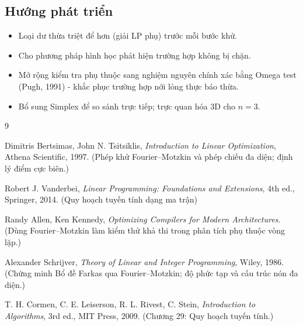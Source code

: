 \documentclass[12pt,a4paper]{article}
\theoremstyle{definition}
\begin{document}
\subsection{Hướng phát triển}

\begin{itemize}
    \item Loại dư thừa triệt để hơn (giải LP phụ) trước mỗi bước khử.
    \item Cho phương pháp hình học phát hiện trường hợp không bị chặn.
    \item Mở rộng kiểm tra phụ thuộc sang nghiệm nguyên chính xác bằng Omega
          test (Pugh, 1991) - khắc phục trường hợp nới lỏng thực báo thừa.
    \item Bổ sung Simplex để so sánh trực tiếp; trực quan hóa 3D cho $n = 3$.
\end{itemize}

\newpage
\renewcommand{\refname}{Tài liệu tham khảo}
\renewcommand{\bibname}{Tài liệu tham khảo}
\gappto\captionsvietnamese{%
  \renewcommand{\refname}{Tài liệu tham khảo}%
  \renewcommand{\bibname}{Tài liệu tham khảo}%
}

\begin{thebibliography}{9}

Dimitris Bertsimas, John N. Tsitsiklis,
\textit{Introduction to Linear Optimization},
Athena Scientific, 1997. (Phép khử Fourier--Motzkin và phép chiếu đa diện;
định lý điểm cực biên.)

Robert J. Vanderbei,
\textit{Linear Programming: Foundations and Extensions},
4th ed., Springer, 2014. (Quy hoạch tuyến tính dạng ma trận)

Randy Allen, Ken Kennedy,
\textit{Optimizing Compilers for Modern Architectures}. (Dùng Fourier--Motzkin làm kiểm thử khả thi
trong phân tích phụ thuộc vòng lặp.)

Alexander Schrijver,
\textit{Theory of Linear and Integer Programming},
Wiley, 1986. (Chứng minh Bổ đề Farkas qua Fourier--Motzkin; độ phức tạp và cấu
trúc nón đa diện.)

T. H. Cormen, C. E. Leiserson, R. L. Rivest, C. Stein,
\textit{Introduction to Algorithms},
3rd ed., MIT Press, 2009. (Chương 29: Quy hoạch tuyến tính.)

\end{thebibliography}
\end{document}
